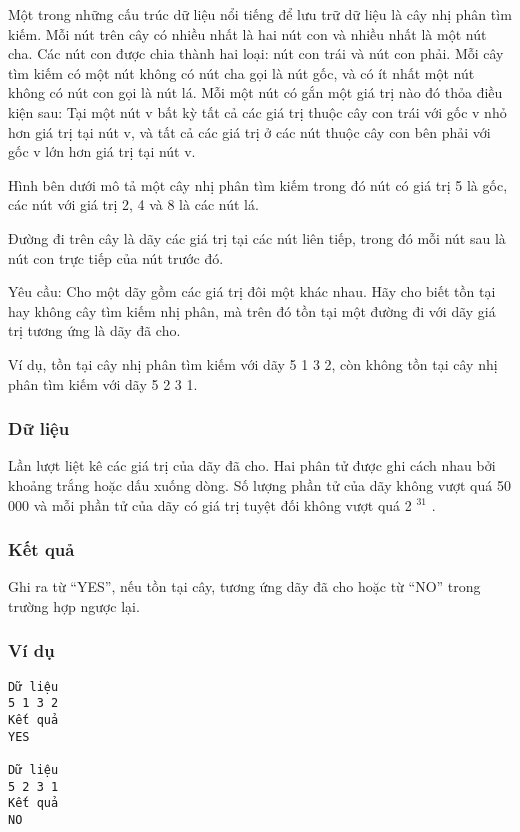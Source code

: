 



   Một trong những cấu trúc dữ liệu nổi tiếng để lưu trữ dữ liệu là cây nhị phân tìm kiếm. Mỗi nút trên cây có nhiều nhất là hai nút con và nhiều nhất là một nút cha. Các nút con được chia thành hai loại: nút con trái và nút con phải. Mỗi cây tìm kiếm có một nút không có nút cha gọi là nút gốc, và có ít nhất một nút không có nút con gọi là nút lá. Mỗi một nút có gắn một giá trị nào đó thỏa điều kiện sau: Tại một nút v bất kỳ tất cả các giá trị thuộc cây con trái với gốc v nhỏ hơn giá trị tại nút v, và tất cả các giá trị ở các nút thuộc cây con bên phải với gốc v lớn hơn giá trị tại nút v.  

   Hình bên dưới mô tả một cây nhị phân tìm kiếm trong đó nút có giá trị 5 là gốc, các nút với giá trị 2, 4 và 8 là các nút lá.  

   Đường đi trên cây là dãy các giá trị tại các nút liên tiếp, trong đó mỗi nút sau là nút con trực tiếp của nút trước đó.  

   Yêu cầu: Cho một dãy gồm các giá trị đôi một khác nhau. Hãy cho biết tồn tại hay không cây tìm kiếm nhị phân, mà trên đó tồn tại một đường đi với dãy giá trị tương ứng là dãy đã cho.  

   Ví dụ, tồn tại cây nhị phân tìm kiếm với dãy 5 1 3 2, còn không tồn tại cây nhị phân tìm kiếm với dãy 5 2 3 1.  

\subsubsection{   Dữ liệu  }

   Lần lượt liệt kê các giá trị của dãy đã cho. Hai phân tử được ghi cách nhau bởi khoảng trắng hoặc dấu xuống dòng. Số lượng phần tử của dãy không vượt quá 50 000 và mỗi phần tử của dãy có giá trị tuyệt đối không vượt quá 2   $^    31   $   .  

\subsubsection{   Kết quả  }

   Ghi ra từ “YES”, nếu tồn tại cây, tương ứng dãy đã cho hoặc từ “NO” trong trường hợp ngược lại.  

\subsubsection{   Ví dụ  }
\begin{verbatim}
Dữ liệu
5 1 3 2	
Kết quả
YES

Dữ liệu
5 2 3 1	
Kết quả
NO
\end{verbatim}